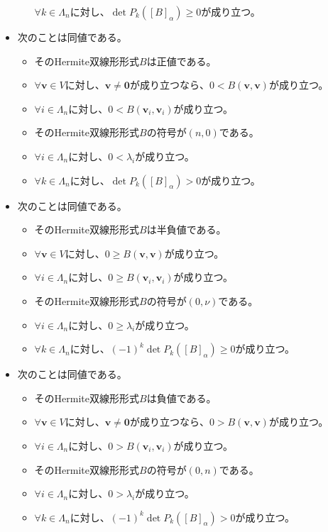 \documentclass[dvipdfmx]{jsarticle}
\begin{document}
\begin{thm}[Hermite双線形形式の符号に関する定理]
\begin{itemize}
\begin{itemize}
    $\forall k \in \varLambda_{n}$に対し、$\det{P_{k}\left( [ B]_{\alpha} \right)} \geq 0$が成り立つ。
  \end{itemize}
\item
  次のことは同値である。
  \begin{itemize}
  \item
    そのHermite双線形形式$B$は正値である。
  \item
    $\forall\mathbf{v} \in V$に対し、$\mathbf{v} \neq \mathbf{0}$が成り立つなら、$0 < B\left( \mathbf{v},\mathbf{v} \right)$が成り立つ。
  \item
    $\forall i \in \varLambda_{n}$に対し、$0 < B\left( \mathbf{v}_{i},\mathbf{v}_{i} \right)$が成り立つ。
  \item
    そのHermite双線形形式$B$の符号が$(n,0)$である。
  \item
    $\forall i \in \varLambda_{n}$に対し、$0 < \lambda_{i}$が成り立つ。
  \item
    $\forall k \in \varLambda_{n}$に対し、$\det{P_{k}\left( [ B]_{\alpha} \right)} > 0$が成り立つ。
  \end{itemize}
\item
  次のことは同値である。
  \begin{itemize}
  \item
    そのHermite双線形形式$B$は半負値である。
  \item
    $\forall\mathbf{v} \in V$に対し、$0 \geq B\left( \mathbf{v},\mathbf{v} \right)$が成り立つ。
  \item
    $\forall i \in \varLambda_{n}$に対し、$0 \geq B\left( \mathbf{v}_{i},\mathbf{v}_{i} \right)$が成り立つ。
  \item
    そのHermite双線形形式$B$の符号が$(0,\nu)$である。
  \item
    $\forall i \in \varLambda_{n}$に対し、$0 \geq \lambda_{i}$が成り立つ。
  \item
    $\forall k \in \varLambda_{n}$に対し、$(-1)^{k} \det{P_{k}\left( [ B]_{\alpha} \right)} \geq 0$が成り立つ。
  \end{itemize}
\item
  次のことは同値である。
  \begin{itemize}
  \item
    そのHermite双線形形式$B$は負値である。
  \item
    $\forall\mathbf{v} \in V$に対し、$\mathbf{v} \neq \mathbf{0}$が成り立つなら、$0 > B\left( \mathbf{v},\mathbf{v} \right)$が成り立つ。
  \item
    $\forall i \in \varLambda_{n}$に対し、$0 > B\left( \mathbf{v}_{i},\mathbf{v}_{i} \right)$が成り立つ。
  \item
    そのHermite双線形形式$B$の符号が$(0,n)$である。
  \item
    $\forall i \in \varLambda_{n}$に対し、$0 > \lambda_{i}$が成り立つ。
  \item
    $\forall k \in \varLambda_{n}$に対し、$(-1)^{k} \det{P_{k}\left( [ B]_{\alpha} \right)} > 0$が成り立つ。
  \end{itemize}
\end{itemize}
\end{thm}
\end{document}
